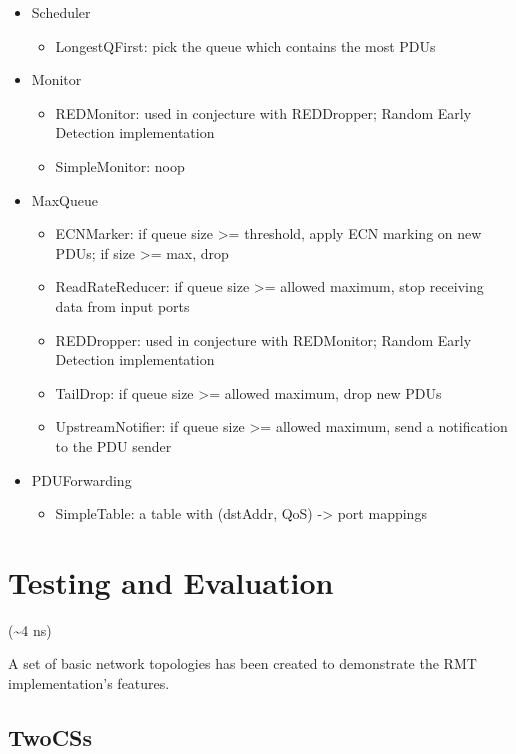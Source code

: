         \begin{itemize}
            \item Scheduler
            \begin{itemize}
                \item LongestQFirst: pick the queue which contains the most PDUs
            \end{itemize}
            \item Monitor
            \begin{itemize}
                \item REDMonitor: used in conjecture with REDDropper; Random Early Detection implementation
                \item SimpleMonitor: noop
            \end{itemize}
            \item MaxQueue
            \begin{itemize}
                \item ECNMarker: if queue size >= threshold, apply ECN marking on new PDUs; if size >= max, drop
                \item ReadRateReducer: if queue size >= allowed maximum, stop receiving data from input ports
                \item REDDropper: used in conjecture with REDMonitor; Random Early Detection implementation
                \item TailDrop: if queue size >= allowed maximum, drop new PDUs
                \item UpstreamNotifier: if queue size >= allowed maximum, send a notification to the PDU sender
            \end{itemize}
            \item PDUForwarding
            \begin{itemize}
                \item SimpleTable: a table with {(dstAddr, QoS) -> port} mappings
            \end{itemize}
        \end{itemize}


\chapter{Testing and Evaluation}
    (\textasciitilde4 ns)

    A set of basic network topologies has been created to demonstrate the RMT implementation's features.

    \section{TwoCSs}

